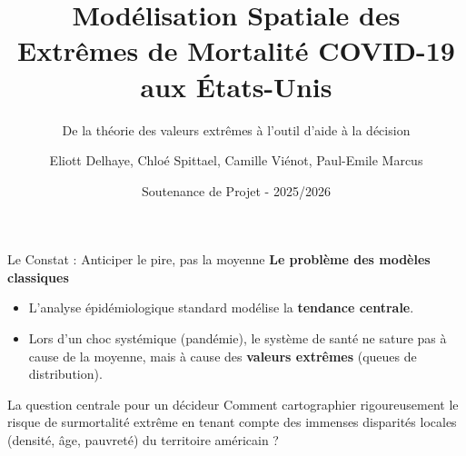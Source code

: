 \documentclass[10pt, aspectratio=1610]{beamer}
\title[Extrêmes COVID-19 (EVT-CART)]{Modélisation Spatiale des Extrêmes de Mortalité COVID-19 aux États-Unis}
\subtitle{De la théorie des valeurs extrêmes à l'outil d'aide à la décision}
\author[Équipe IMI]{Eliott Delhaye, Chloé Spittael, Camille Viénot, Paul-Emile Marcus}
\institute[ENPC]{École Nationale des Ponts et Chaussées}
\date{Soutenance de Projet - 2025/2026}
\begin{document}
\begin{frame}
    \titlepage
\end{frame}

\begin{frame}{Le Constat : Anticiper le pire, pas la moyenne}
    \textbf{Le problème des modèles classiques}
    \begin{itemize}
        \item L'analyse épidémiologique standard modélise la \textbf{tendance centrale}.
        \item Lors d'un choc systémique (pandémie), le système de santé ne sature pas à cause de la moyenne, mais à cause des \textbf{valeurs extrêmes} (queues de distribution).
    \end{itemize}
    \vspace{0.4cm}
    
    \begin{alertblock}{La question centrale pour un décideur}
    Comment cartographier rigoureusement le risque de surmortalité extrême en tenant compte des immenses disparités locales (densité, âge, pauvreté) du territoire américain ?
    \end{alertblock}
\end{frame}
\end{document}
